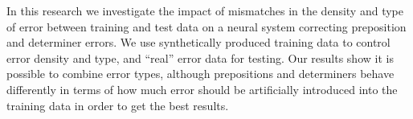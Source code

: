 In this research we investigate the impact of mismatches in the density and type of error between training and test data on a neural system correcting preposition and determiner errors. We use synthetically produced training data to control error density and type, and ``real'' error data for testing. Our results show it is possible to combine error types, although prepositions and determiners behave differently in terms of how much error should be artificially introduced into the training data in order to get the best results.
